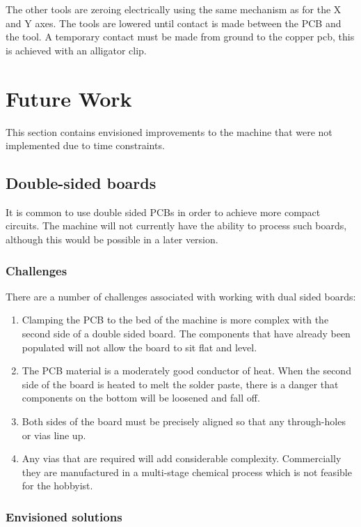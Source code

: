 The other tools are zeroing electrically using the same mechanism as for the X and Y axes. The tools are lowered until contact is made between the PCB and the tool. A temporary contact must be made from ground
to the copper pcb, this is achieved with an alligator clip.

\section{Future Work}
This section contains envisioned improvements to the machine that were not implemented due to time constraints.

\subsection{Double-sided boards}
It is common to use double sided PCBs in order to achieve more compact circuits. The machine will not currently have the ability to process such boards, although this would be possible in a later version.

\subsubsection{Challenges}
There are a number of challenges associated with working with dual sided boards:

\begin{enumerate}
	\item	Clamping the PCB to the bed of the machine is more complex with the second side of a double sided board. The components that have
			already been populated will not allow the board to sit flat and level.
	\item	The PCB material is a moderately good conductor of heat. When the second side of the board is heated to melt the solder paste, there
			is a danger that components on the bottom will be loosened and fall off.
	\item	Both sides of the board must be precisely aligned so that any through-holes or vias line up.
	\item	Any vias that are required will add considerable complexity. Commercially they are manufactured in a multi-stage chemical process
			which is not feasible for the hobbyist.
\end{enumerate}

\subsubsection{Envisioned solutions}

